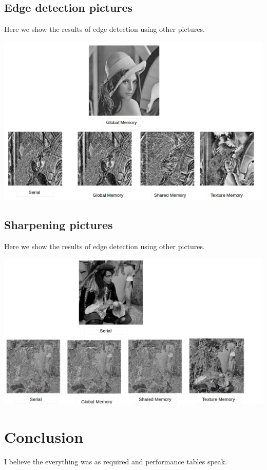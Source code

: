  \subsection*{Edge detection pictures}
 Here we show the results of edge detection using other pictures.
 
 \includegraphics[scale=0.5]{images/lenaEdge.png}
 
  \subsection*{Sharpening pictures}
 Here we show the results of edge detection using other pictures.
 
  \includegraphics[scale=0.5]{images/manSharp.png}
  
 \section*{Conclusion}
 I believe the everything was as required and performance tables speak.

 

